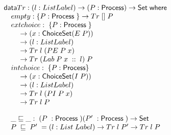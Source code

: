 \documentclass{beamer}
\newcommand{\ar}{\rightarrow}
\newcommand{\datarm}{\mathsf{data}}
\newcommand{\wheresf}{\mathsf{where}}
\newcommand{\Set}{\mathsf{Set}}
\newcommand{\Process}{\mathsf{Process}}
\newcommand{\ChoiceSet}{\mathsf{ChoiceSet}}
\begin{document}
%
%
%


\begin{frame}

\[\begin{array}[t]{@{}lcl} 
\datarm Tr  : (l : List Label)\ar (P : \Process ) \ar \Set \;  \wheresf \\
\mbox{\quad} empty : \{ P : \Process \; \} \ar Tr \; [] \; P \\
\mbox{\quad}extchoice : \; \{ P : \Process \; \} \\
\mbox{\quad}\mbox{\quad} \ar  (x : \ChoiceSet (E \; P )) \\
\mbox{\quad}\mbox{\quad} \ar (l : List Label)\\
\mbox{\quad}\mbox{\quad} \ar Tr \; l \; (PE\; P \; x) \\
\mbox{\quad}\mbox{\quad} \ar Tr\; (Lab\; P\; x\; ::\; l)\; P\\
\mbox{\quad}intchoice : \; \{ P : \Process  \} \\
\mbox{\quad}\mbox{\quad} \ar  (x : \ChoiceSet (I  \; P)) \\
\mbox{\quad}\mbox{\quad} \ar (l : List Label)\\
\mbox{\quad}\mbox{\quad} \ar Tr \; l \; (PI\; P\; x) \\
\mbox{\quad}\mbox{\quad} \ar Tr\;l \; P\\

\end{array} \]

\end{frame}


\begin{frame}

\[\begin{array}[t]{@{}lcl} 
\_\refinedby\_ :\; (P\;: \Process \; ) (P'\;: \Process \; )\ar \Set  \\
P \;\refinedby \;P' \; = (l : List \; Label) \ar Tr \; l \; P' \ar Tr \; l \; P\\



\end{array} \]



\end{frame}
\end{document}
